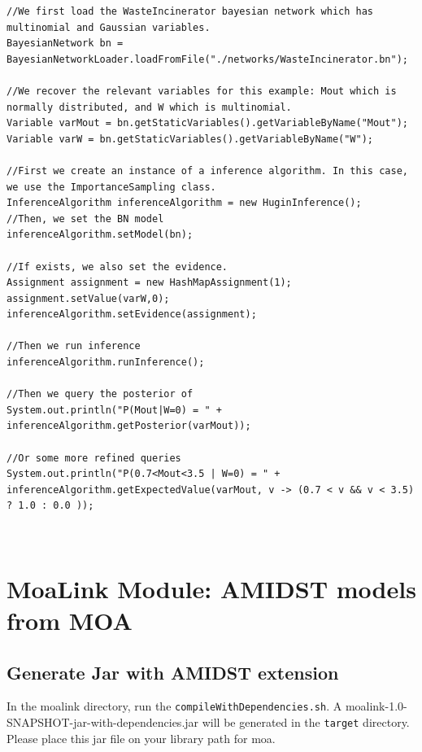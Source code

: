 \begin{lstlisting}
//We first load the WasteIncinerator bayesian network which has multinomial and Gaussian variables.
BayesianNetwork bn = BayesianNetworkLoader.loadFromFile("./networks/WasteIncinerator.bn");

//We recover the relevant variables for this example: Mout which is normally distributed, and W which is multinomial.
Variable varMout = bn.getStaticVariables().getVariableByName("Mout");
Variable varW = bn.getStaticVariables().getVariableByName("W");

//First we create an instance of a inference algorithm. In this case, we use the ImportanceSampling class.
InferenceAlgorithm inferenceAlgorithm = new HuginInference();
//Then, we set the BN model
inferenceAlgorithm.setModel(bn);

//If exists, we also set the evidence.
Assignment assignment = new HashMapAssignment(1);
assignment.setValue(varW,0);
inferenceAlgorithm.setEvidence(assignment);

//Then we run inference
inferenceAlgorithm.runInference();

//Then we query the posterior of
System.out.println("P(Mout|W=0) = " + inferenceAlgorithm.getPosterior(varMout));

//Or some more refined queries
System.out.println("P(0.7<Mout<3.5 | W=0) = " + inferenceAlgorithm.getExpectedValue(varMout, v -> (0.7 < v && v < 3.5) ? 1.0 : 0.0 ));

\end{lstlisting}


\begin{lstlisting}


\end{lstlisting}

\chapter{MoaLink Module: AMIDST models from MOA}\label{sec:codeExamples}

\section{Generate Jar with AMIDST extension}
In the moalink directory, run the \texttt{compileWithDependencies.sh}. A moalink-1.0-SNAPSHOT-jar-with-dependencies.jar will be generated in the \texttt{target} directory. Please place this jar file on your library path for moa. 

